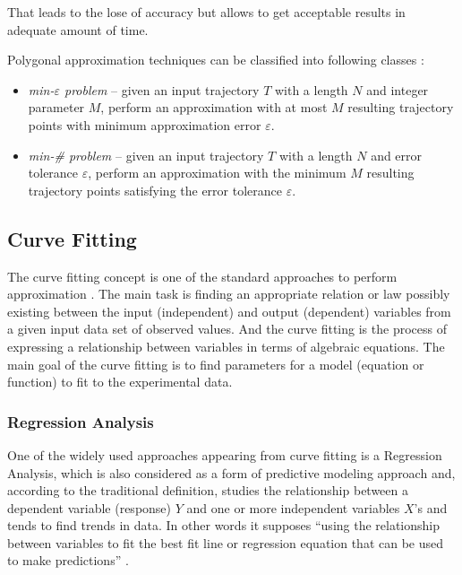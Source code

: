 That leads to the lose of accuracy but allows to get acceptable results in adequate amount of time.

Polygonal approximation techniques can be classified into following classes \cite{article:multir_pol_appr}:

\begin{itemize}
	\setlength\itemsep{0em}
	\item \textit{min-$\varepsilon$ problem} -- given an input trajectory $T$ with a length $N$ and integer parameter $M$, perform an approximation with at most $M$ resulting trajectory points with minimum approximation error $\varepsilon$.
	\item \textit{min-\# problem} -- given an input trajectory $T$ with a length $N$ and error tolerance $\varepsilon$, perform an approximation with the minimum $M$ resulting trajectory points satisfying the error tolerance $\varepsilon$.
\end{itemize}

\subsection{Curve Fitting}

The curve fitting concept is one of the standard approaches to perform approximation \cite{article:behav_form_extr}. The main task is finding an appropriate relation or law possibly existing between the input (independent) and output (dependent) variables from a given input data set of observed values. And the curve fitting is the process of expressing a relationship between variables in terms of algebraic equations. The main goal of the curve fitting is to find parameters for a model (equation or function) to fit to the experimental data. 

\subsubsection{Regression Analysis}

One of the widely used approaches appearing from curve fitting is a Regression Analysis, which is also considered as a form of predictive modeling approach and, according to the traditional definition, studies the relationship between a dependent variable (response) $Y$ and one or more independent variables $X$'s and tends to find trends in data. In other words it supposes ``using the relationship between variables to fit the best fit line or regression equation that can be used to make predictions'' \cite{online:intro_lr_pr}.

